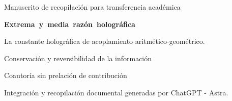 \thispagestyle{plain}
\begin{center}
{\fontsize{10}{12}\selectfont Manuscrito de recopilación para transferencia académica\par}
\vspace{2mm}
{\fontsize{17}{20.5}\selectfont\bfseries\mbox{Extrema y media razón holográfica}\par}
\vspace{2mm}
{\fontsize{11}{13.5}\selectfont
La constante holográfica de acoplamiento aritmético-geométrico.\par
Conservación y reversibilidad de la información\par}
\vspace{2mm}
{\fontsize{11.5}{14}\selectfont\Autores\par}
\vspace{2mm}
{\fontsize{8}{10}\selectfont Coautoría sin prelación de contribución\par
Integración y recopilación documental generadas por ChatGPT - Astra.\par}
\end{center}
\vspace{2mm}
